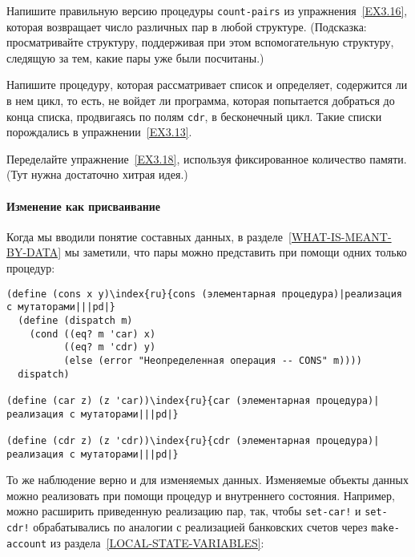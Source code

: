 \begin{exercise}{3.17}\label{EX3.17}%
Напишите правильную версию процедуры
{\tt count-pairs} из упражнения~\ref{EX3.16},
которая возвращает число различных пар в любой структуре.  (Подсказка:
просматривайте структуру, поддерживая при этом вспомогательную
структуру, следящую за тем, какие пары уже были посчитаны.)
\end{exercise}
\begin{exercise}{3.18}\label{EX3.18}%
Напишите процедуру, которая рассматривает список и
определяет, содержится ли в нем цикл, то есть, не войдет ли программа,
которая попытается добраться до конца списка, продвигаясь по полям
{\tt cdr}, в бесконечный цикл.  Такие списки порождались в
упражнении~\ref{EX3.13}.
\end{exercise}
\begin{exercise}{3.19}\label{EX3.19}%
Переделайте упражнение~\ref{EX3.18},
используя фиксированное количество памяти.  (Тут нужна достаточно
хитрая идея.)
\end{exercise}

\paragraph{Изменение как присваивание}


Когда мы вводили понятие составных данных, в
разделе~\ref{WHAT-IS-MEANT-BY-DATA} мы заметили, что пары можно
представить при помощи одних только процедур:

\begin{Verbatim}[fontsize=\small]
(define (cons x y)\index{ru}{cons (элементарная процедура)|реализация с мутаторами|||pd|}
  (define (dispatch m)
    (cond ((eq? m 'car) x)
          ((eq? m 'cdr) y)
          (else (error "Неопределенная операция -- CONS" m))))
  dispatch)

(define (car z) (z 'car))\index{ru}{car (элементарная процедура)|реализация с мутаторами|||pd|}

(define (cdr z) (z 'cdr))\index{ru}{cdr (элементарная процедура)|реализация с мутаторами|||pd|}
\end{Verbatim}
То же наблюдение верно и для изменяемых данных.  Изменяемые объекты
данных можно реализовать при помощи процедур и внутреннего состояния.
Например, можно расширить приведенную реализацию пар, так, чтобы
{\tt set-car!} и {\tt set-cdr!} обрабатывались
по аналогии с реализацией банковских счетов через
{\tt make-account} из раздела~\ref{LOCAL-STATE-VARIABLES}:


